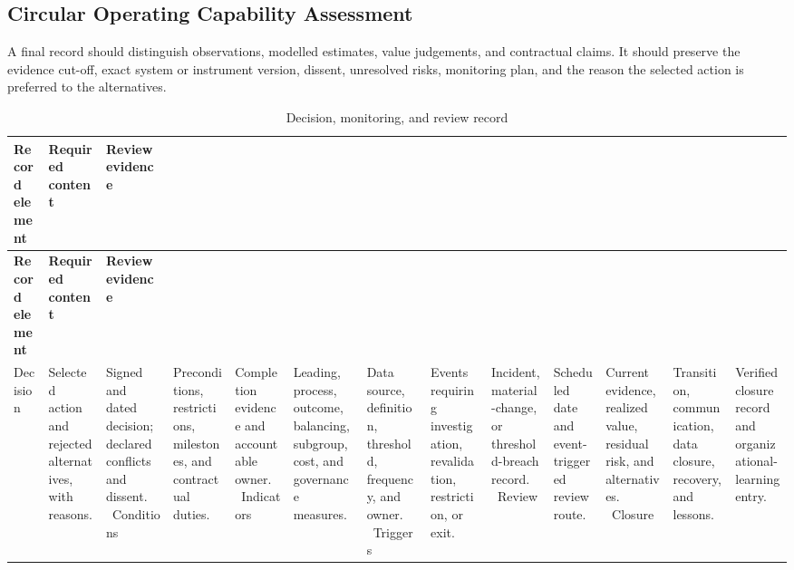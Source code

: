 \subsection{Circular Operating Capability Assessment}
\label{sec:comp-ch13-supp-3}
A final record should distinguish observations, modelled estimates, value
judgements, and contractual claims. It should preserve the evidence cut-off, exact
system or instrument version, dissent, unresolved risks, monitoring plan, and the
reason the selected action is preferred to the alternatives.

\begin{longtable}{@{}p{}p{}p{}@{}}
\caption{Decision, monitoring, and review record}
\label{tab:comp-ch13-decision-record}\\
\toprule
\textbf{Record element} & \textbf{Required content} & \textbf{Review evidence} \\
\midrule
\endfirsthead
\toprule
\textbf{Record element} & \textbf{Required content} & \textbf{Review evidence} \\
\midrule
\endhead
\bottomrule
\endlastfoot
Decision & Selected action and rejected alternatives, with reasons. & Signed and dated decision; declared conflicts and dissent. \
Conditions & Preconditions, restrictions, milestones, and contractual duties. & Completion evidence and accountable owner. \
Indicators & Leading, process, outcome, balancing, subgroup, cost, and governance measures. & Data source, definition, threshold, frequency, and owner. \
Triggers & Events requiring investigation, revalidation, restriction, or exit. & Incident, material-change, or threshold-breach record. \
Review & Scheduled date and event-triggered review route. & Current evidence, realized value, residual risk, and alternatives. \
Closure & Transition, communication, data closure, recovery, and lessons. & Verified closure record and organizational-learning entry. \
\end{longtable}
